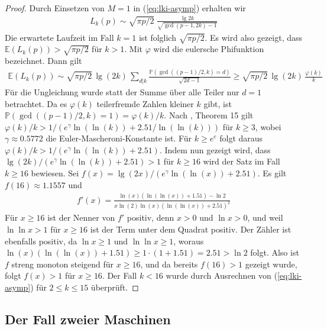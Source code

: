 \documentclass[a4paper, 11pt, ngerman]{article}
\newcommand{\E}{\mathbb{E}}
\renewcommand{\P}{\mathbb{P}}
\theoremstyle{definition}
\theoremstyle{plain}
\theoremstyle{remark}
\begin{document}
\begin{proof}
    Durch Einsetzen von $M = 1$ in (\ref{eq:lki-asymp}) erhalten wir
    \begin{align*}
        L_k(p) \sim \sqrt {\pi p / 2} \;
        \frac {\lg 2k} {\sqrt{\gcd(p - 1, 2k) - 1}}
    \end{align*}
    Die erwartete Laufzeit im Fall $k = 1$ ist folglich $\sqrt{\pi p/2}$. Es wird also gezeigt, dass $\E(L_k(p)) > \sqrt{\pi p / 2}$ für $k > 1$. Mit $\varphi$ wird die eulersche Phifunktion bezeichnet. Dann gilt
    \begin{align*}
        \E(L_k(p))
        \sim \sqrt{\pi p / 2} \, \lg (2k) \,
        \sum_{d | k} \frac {\P(\gcd((p - 1)/2, k) = d)}
        { \sqrt {2d - 1}} \nonumber
        \ge \sqrt{\pi p / 2} \, \lg (2k) \, \frac {\varphi(k)} k
    \end{align*}
    Für die Ungleichung wurde statt der Summe über alle Teiler nur $d = 1$ betrachtet. Da es $\varphi(k)$ teilerfremde Zahlen kleiner $k$ gibt, ist $\P(\gcd((p - 1)/2, k) = 1) = \varphi(k)/k$. Nach \cite{rs62}, Theorem 15 gilt $ \varphi(k) / k > 1 / (e^\gamma \ln (\ln (k)) + 2.51 / \ln (\ln (k)))$ für $k \ge 3$, wobei $\gamma \approx 0.5772$ die Euler-Mascheroni-Konstante ist. Für $k \ge e^e$ folgt daraus $\varphi(k) / k > 1/(e^\gamma \ln(\ln(k)) + 2.51)$. Indem nun gezeigt wird, dass $\lg (2k) / (e^\gamma \ln (\ln (k)) + 2.51) > 1$ für $k \ge 16$ wird der Satz im Fall $k \ge 16$ bewiesen. Sei $f(x) = \lg (2x) / (e^\gamma \ln (\ln (x)) + 2.51)$. Es gilt $f(16) \approx 1.1557$ und
    \begin{align*}
        f'(x)
        = \frac {\ln (x)(\ln (\ln (x)) + 1.51) - \ln 2}
        {x \ln (2) \ln (x)(\ln(\ln(x)) + 2.51)^2}
    \end{align*}
    Für $x \ge 16$ ist der Nenner von $f'$ positiv, denn $x > 0$ und $\ln x > 0$, und weil $\ln \ln x > 1$ für $x \ge 16$ ist der Term unter dem Quadrat positiv. Der Zähler ist ebenfalls positiv, da $\ln x \ge 1$ und $\ln \ln x \ge 1$, woraus $\ln(x)(\ln(\ln(x)) + 1.51) \ge 1 \cdot (1 + 1.51) = 2.51 > \ln 2$ folgt. Also ist $f$ streng monoton steigend für $x \ge 16$, und da bereits $f(16) > 1$ gezeigt wurde, folgt $f(x) > 1$ für $x \ge 16$. Der Fall $k < 16$ wurde durch Ausrechnen von (\ref{eq:lki-asymp}) für $2 \le k \le 15$ überprüft.
\end{proof}

\subsection{Der Fall zweier Maschinen}
\end{document}

